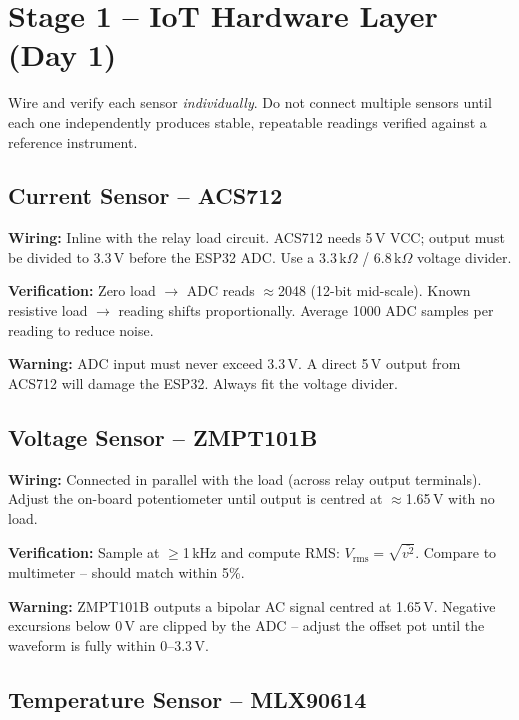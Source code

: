 \documentclass[12pt,a4paper]{article}
\newenvironment{warnbox}{%
  \begin{mdframed}[backgroundcolor=warnbg,linecolor=warnln,linewidth=1.5pt,
    innerleftmargin=9pt,innerrightmargin=9pt,innertopmargin=5pt,innerbottommargin=5pt]
  \textbf{\color{warnln}Warning: }}{\end{mdframed}}
\begin{document}
\section{Stage 1 -- IoT Hardware Layer (Day 1)}

Wire and verify each sensor \textit{individually}. Do not connect multiple sensors until each one
independently produces stable, repeatable readings verified against a reference instrument.

\subsection{Current Sensor -- ACS712}

\textbf{Wiring:} Inline with the relay load circuit. ACS712 needs 5\,V VCC; output must be divided to 3.3\,V
before the ESP32 ADC. Use a 3.3\,k$\Omega$ / 6.8\,k$\Omega$ voltage divider.

\textbf{Verification:} Zero load $\rightarrow$ ADC reads $\approx$2048 (12-bit mid-scale). Known resistive
load $\rightarrow$ reading shifts proportionally. Average 1000 ADC samples per reading to reduce noise.

\begin{warnbox}
ADC input must never exceed 3.3\,V. A direct 5\,V output from ACS712 will damage the ESP32. Always fit
the voltage divider.
\end{warnbox}

\subsection{Voltage Sensor -- ZMPT101B}

\textbf{Wiring:} Connected in parallel with the load (across relay output terminals). Adjust the on-board
potentiometer until output is centred at $\approx$1.65\,V with no load.

\textbf{Verification:} Sample at $\geq$1\,kHz and compute RMS:
$V_{\text{rms}} = \sqrt{\overline{v^2}}$.
Compare to multimeter -- should match within 5\%.

\begin{warnbox}
ZMPT101B outputs a bipolar AC signal centred at 1.65\,V. Negative excursions below 0\,V are clipped by
the ADC -- adjust the offset pot until the waveform is fully within 0--3.3\,V.
\end{warnbox}

\subsection{Temperature Sensor -- MLX90614}
\end{document}
